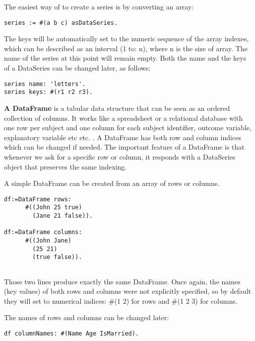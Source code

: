 \documentclass[sigplan]{acmart}
\makeatletter
\newcommand*{\etc}{%
    \@ifnextchar{.}%
        {etc}%
        {etc.\@\xspace}%
}
\makeatother
\begin{document}
The easiest way of to create a series is by converting an array: 

\begin{lstlisting}[basicstyle=\small,language=Smalltalk]
series := #(a b c) asDataSeries.
\end{lstlisting}

The keys will be automatically set to the numeric sequence of the array indexes, which can be described as an interval (1 to: n), where n is the size of array. The name of the series at this point will remain empty. Both the name and the keys of a DataSeries can be changed later, as follows:

\begin{lstlisting}[basicstyle=\small,language=Smalltalk]
series name: 'letters'.
series keys: #(r1 r2 r3).
\end{lstlisting}

\textbf{A DataFrame} is a tabular data structure that can be seen as an ordered collection of columns. It works like a spreadsheet or a relational database with one row per subject and one column for each subject identifier, outcome variable, explanatory variable \etc. A DataFrame has both row and column indices which can be changed if needed. The important feature of a DataFrame is that whenever we ask for a specific row or column, it responds with a DataSeries object that preserves the same indexing.

A simple DataFrame can be created from an array of rows or columns.

\begin{lstlisting}[basicstyle=\small,language=Smalltalk]
df:=DataFrame rows:
      #((John 25 true)
        (Jane 21 false)).
        
df:=DataFrame columns:
      #((John Jane)
        (25 21)
        (true false)).
        
\end{lstlisting}

Those two lines produce exactly the same DataFrame. Once again, the names (key values) of both rows and columns were not explicitly specified, so by default they will set to numerical indices: \#(1 2) for rows and \#(1 2 3) for columns.

The names of rows and columns can be changed later:

\begin{lstlisting}[basicstyle=\small,language=Smalltalk]
df columnNames: #(Name Age IsMarried).
\end{lstlisting}
\end{document}
